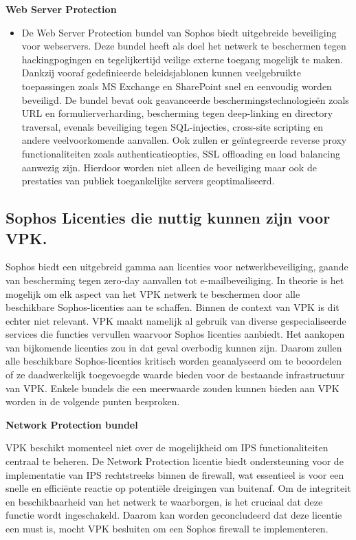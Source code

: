\textbf{Web Server Protection}
\begin{itemize}[label=\textbullet]
    \item  De Web Server Protection bundel van Sophos biedt uitgebreide beveiliging voor webservers. Deze bundel heeft als doel het netwerk te beschermen tegen hackingpogingen en tegelijkertijd veilige externe toegang mogelijk te maken. Dankzij vooraf gedefinieerde beleidsjablonen kunnen veelgebruikte toepassingen zoals MS Exchange en SharePoint snel en eenvoudig worden beveiligd. De bundel bevat ook geavanceerde beschermingstechnologieën zoals URL en formulierverharding, bescherming tegen deep-linking en directory traversal, evenals beveiliging tegen SQL-injecties, cross-site scripting en andere veelvoorkomende aanvallen. Ook zullen er geïntegreerde reverse proxy functionaliteiten zoals authenticatieopties, SSL offloading en load balancing aanwezig zijn. Hierdoor worden niet alleen de beveiliging maar ook de prestaties van publiek toegankelijke servers geoptimaliseerd.
\end{itemize}

\subsection{Sophos Licenties die nuttig kunnen zijn voor VPK.}
Sophos biedt een uitgebreid gamma aan licenties voor netwerkbeveiliging, gaande van bescherming tegen zero-day aanvallen tot e-mailbeveiliging. In theorie is het mogelijk om elk aspect van het VPK netwerk te beschermen door alle beschikbare Sophos-licenties aan te schaffen. Binnen de context van VPK is dit echter niet relevant. VPK maakt namelijk al gebruik van diverse gespecialiseerde services die functies vervullen waarvoor Sophos licenties aanbiedt. Het aankopen van bijkomende licenties zou in dat geval overbodig kunnen zijn. Daarom zullen alle beschikbare Sophos-licenties kritisch worden geanalyseerd om te beoordelen of ze daadwerkelijk toegevoegde waarde bieden voor de bestaande infrastructuur van VPK. Enkele bundels die een meerwaarde zouden kunnen bieden aan VPK worden in de volgende punten besproken.


\textbf{Network Protection bundel}

VPK beschikt momenteel niet over de mogelijkheid om IPS functionaliteiten centraal te beheren. De Network Protection licentie biedt ondersteuning voor de implementatie van IPS rechtstreeks binnen de firewall, wat essentieel is voor een snelle en efficiënte reactie op potentiële dreigingen van buitenaf. Om de integriteit en beschikbaarheid van het netwerk te waarborgen, is het cruciaal dat deze functie wordt ingeschakeld. Daarom kan worden geconcludeerd dat deze licentie een must is, mocht VPK besluiten om een Sophos firewall te implementeren.


